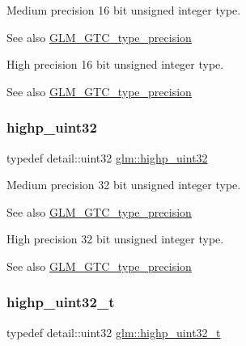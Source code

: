 Medium precision 16 bit unsigned integer type. \begin{DoxySeeAlso}{See also}
\hyperlink{group__gtc__type__precision}{G\+L\+M\+\_\+\+G\+T\+C\+\_\+type\+\_\+precision}
\end{DoxySeeAlso}
High precision 16 bit unsigned integer type. \begin{DoxySeeAlso}{See also}
\hyperlink{group__gtc__type__precision}{G\+L\+M\+\_\+\+G\+T\+C\+\_\+type\+\_\+precision} 
\end{DoxySeeAlso}
\mbox{\label{group__gtc__type__precision_ga3145e44c73e2df7dfe4f3cb65974bf22}} 
\subsubsection{\texorpdfstring{highp\+\_\+uint32}{highp\_uint32}}
{\footnotesize\ttfamily typedef detail\+::uint32 \hyperlink{group__gtc__type__precision_ga3145e44c73e2df7dfe4f3cb65974bf22}{glm\+::highp\+\_\+uint32}}

Medium precision 32 bit unsigned integer type. \begin{DoxySeeAlso}{See also}
\hyperlink{group__gtc__type__precision}{G\+L\+M\+\_\+\+G\+T\+C\+\_\+type\+\_\+precision}
\end{DoxySeeAlso}
High precision 32 bit unsigned integer type. \begin{DoxySeeAlso}{See also}
\hyperlink{group__gtc__type__precision}{G\+L\+M\+\_\+\+G\+T\+C\+\_\+type\+\_\+precision} 
\end{DoxySeeAlso}
\mbox{\label{group__gtc__type__precision_ga8eb85ad460079c63b68866ae34637bda}} 
\subsubsection{\texorpdfstring{highp\+\_\+uint32\+\_\+t}{highp\_uint32\_t}}
{\footnotesize\ttfamily typedef detail\+::uint32 \hyperlink{group__gtc__type__precision_ga8eb85ad460079c63b68866ae34637bda}{glm\+::highp\+\_\+uint32\+\_\+t}}

